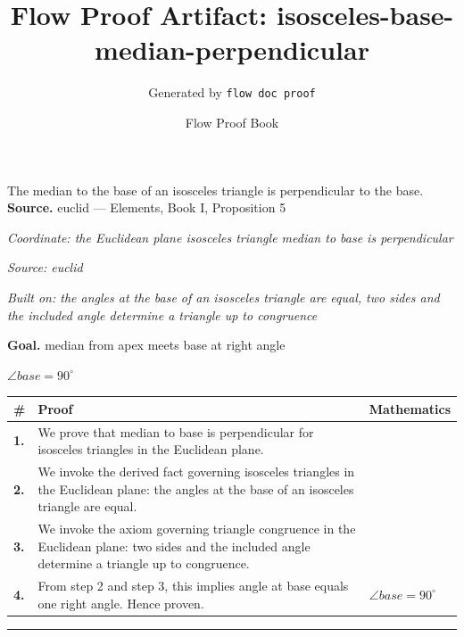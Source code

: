 \documentclass[11pt]{article}
\title{Flow Proof Artifact: isosceles-base-median-perpendicular}
\author{Generated by \texttt{flow doc proof}}
\date{Flow Proof Book}
\theoremstyle{definition}
\begin{document}
\maketitle
The median to the base of an isosceles triangle is perpendicular to the base.\\[0.5em]
\textbf{Source.} euclid — Elements, Book I, Proposition 5\\[0.5em]
\bigskip
{}\par
\smallskip\noindent\textit{Coordinate: the Euclidean plane \cdot isosceles triangle \cdot median to base is perpendicular}\par
\smallskip\noindent\textit{Source: euclid}\par
\smallskip\noindent\textit{Built on: the angles at the base of an isosceles triangle are equal, two sides and the included angle determine a triangle up to congruence}\par
\medskip
\noindent\textbf{Goal.} median from apex meets base at right angle\par
\noindent$\displaystyle \angle base = 90^\circ$\par
\medskip
\noindent
\begin{tabular}{@{} >{\raggedright\arraybackslash}p{} >{\raggedright\arraybackslash}p{} >{\raggedleft\arraybackslash}p{} @{}}
\textbf{\#} & \textbf{Proof} & \textbf{Mathematics} \\
\midrule
\textbf{1.} & We prove that median to base is perpendicular for isosceles triangles in the Euclidean plane. & \\[0.45em]
\textbf{2.} & We invoke the derived fact governing isosceles triangles in the Euclidean plane: the angles at the base of an isosceles triangle are equal. & \\[0.45em]
\textbf{3.} & We invoke the axiom governing triangle congruence in the Euclidean plane: two sides and the included angle determine a triangle up to congruence. & \\[0.45em]
\textbf{4.} & From step 2 and step 3, this implies angle at base equals one right angle. Hence proven. & $\displaystyle \angle base = 90^\circ$ \\[0.45em]
\bottomrule
\end{tabular}
\label{thm:Geometry-isosceles triangle-median_to_base_is_perpendicular}
\par\medskip\hrule
\end{document}
